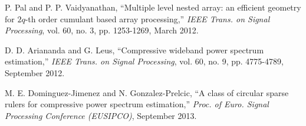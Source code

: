 \documentclass[letterpaper,10pt]{article}
\begin{document}
\begin{thebibliography}{1}
   P. Pal and P. P. Vaidyanathan, ``Multiple level nested array: an efficient geometry for $2q$-th order cumulant based array processing,'' \emph{IEEE Trans. on Signal Processing}, vol. 60, no. 3, pp. 1253-1269, March 2012.

   D. D. Ariananda and G. Leus, ``Compressive wideband power spectrum estimation,'' \emph{IEEE Trans. on Signal Processing}, vol. 60, no. 9, pp. 4775-4789, September 2012.

   M. E. Dominguez-Jimenez and N. Gonzalez-Prelcic, ``A class of circular sparse rulers for compressive power spectrum estimation,'' \emph{Proc. of Euro. Signal Processing Conference (EUSIPCO)}, September 2013.

\end{thebibliography}

\pagebreak
\end{document}
